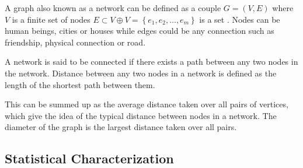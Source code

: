 A graph also known as a network can be defined as a couple $G = (V, E) $ where $V$ is a finite set of nodes $E \subset V \oplus V = \left\lbrace e_1,e_2,\dots, e_m \right\rbrace$ is a set \citep{estrada2012structure}. Nodes can be human beings, cities or houses while edges could be any connection such as friendship, physical connection or road.

A network is said to be connected if there exists a path between any two nodes in the network. Distance between any two nodes in a network is defined as the length of the shortest path between them.

This can be summed up as the average distance taken over all pairs of vertices, which give the idea of the typical distance between nodes in a network. The diameter of the graph is the largest distance taken over all pairs.

\subsection{Statistical Characterization}
 
